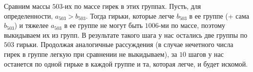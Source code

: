 \documentclass{article}
\begin{document}
Сравним массы $503$-их по массе гирек в этих группах. Пусть, для определенности, $a_{503} > b_{503}$. Тогда гирьки, которые легче $b_{503}$ в ее группе (+ сама $b_{503}$) и тяжелее $a_{503}$ в ее группе не могут быть $1006$-ми по массе, поэтому выкидываем их из групп. В результате такого шага у нас остались две группы по $503$ гирьки. Продолжая аналогичные рассуждения (в случае нечетного числа гирек в группе легкую при сравнении не выкидываем), за $10$ шагов у нас останется по одной гирьке в каждой группе и та, которая легче, и будет искомой.
\end{document}
